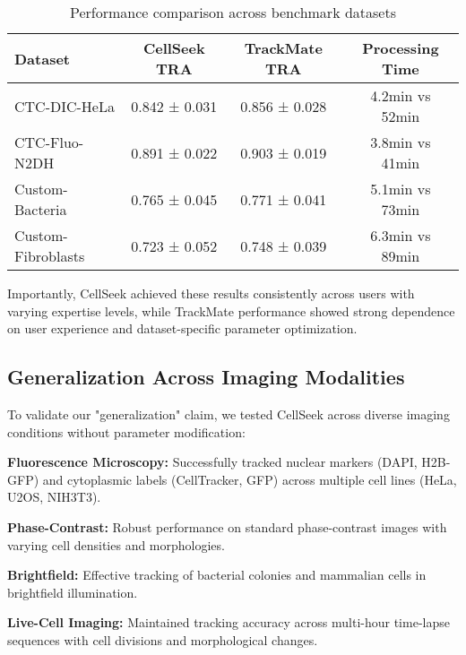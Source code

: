 \documentclass[12pt]{article}
\begin{document}
\begin{table}[H]
  \centering
  \caption{Performance comparison across benchmark datasets}
  \begin{tabular}{lccc}
    \toprule
    \textbf{Dataset}   & \textbf{CellSeek TRA} & \textbf{TrackMate TRA} & \textbf{Processing Time} \\
    \midrule
    CTC-DIC-HeLa       & 0.842 ± 0.031         & 0.856 ± 0.028          & 4.2min vs 52min          \\
    CTC-Fluo-N2DH      & 0.891 ± 0.022         & 0.903 ± 0.019          & 3.8min vs 41min          \\
    Custom-Bacteria    & 0.765 ± 0.045         & 0.771 ± 0.041          & 5.1min vs 73min          \\
    Custom-Fibroblasts & 0.723 ± 0.052         & 0.748 ± 0.039          & 6.3min vs 89min          \\
    \bottomrule
  \end{tabular}
\end{table}

Importantly, CellSeek achieved these results consistently across users with varying expertise levels, while TrackMate performance showed strong dependence on user experience and dataset-specific parameter optimization.

\subsection{Generalization Across Imaging Modalities}


To validate our "generalization" claim, we tested CellSeek across diverse imaging conditions without parameter modification:

\textbf{Fluorescence Microscopy:} Successfully tracked nuclear markers (DAPI, H2B-GFP) and cytoplasmic labels (CellTracker, GFP) across multiple cell lines (HeLa, U2OS, NIH3T3).

\textbf{Phase-Contrast:} Robust performance on standard phase-contrast images with varying cell densities and morphologies.

\textbf{Brightfield:} Effective tracking of bacterial colonies and mammalian cells in brightfield illumination.

\textbf{Live-Cell Imaging:} Maintained tracking accuracy across multi-hour time-lapse sequences with cell divisions and morphological changes.
\end{document}
